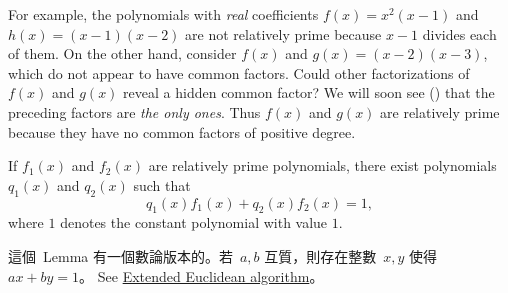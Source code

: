 For example, the polynomials with \emph{real} coefficients \(f(x) = x^2(x - 1)\) and \(h(x) = (x - 1)(x - 2)\) are not relatively prime because \(x - 1\) divides each of them.
On the other hand, consider \(f(x)\) and \(g(x) = (x - 2)(x - 3)\), which do not appear to have common factors.
Could other factorizations of \(f(x)\) and \(g(x)\) reveal a hidden common factor?
We will soon see () that the preceding factors are \emph{the only ones}.
Thus \(f(x)\) and \(g(x)\) are relatively prime because they have no common factors of positive degree.

\begin{lemma} \label{lem e.1}
If \(f_1(x)\) and \(f_2(x)\) are relatively prime polynomials, there exist polynomials \(q_1(x)\) and \(q_2(x)\) such that
\[
    q_1(x) f_1(x) + q_2(x) f_2(x) = 1,
\]
where \(1\) denotes the constant polynomial with value \(1\).
\end{lemma}

\begin{note}
這個\ Lemma 有一個數論版本的。若\ \(a, b\) 互質，則存在整數\ \(x, y\) 使得\ \(ax + by = 1\)。
See \href{https://www.wikiwand.com/en/Extended_Euclidean_algorithm}{Extended Euclidean algorithm}。
\end{note}

